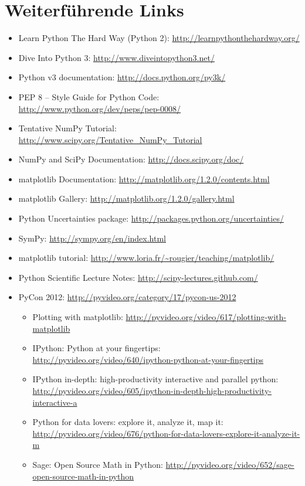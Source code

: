 \section{Weiterführende Links}
\begin{itemize}
  \item Learn Python The Hard Way (Python 2): \url{http://learnpythonthehardway.org/}
  \item Dive Into Python 3: \url{http://www.diveintopython3.net/}
  \item Python v3 documentation: \url{http://docs.python.org/py3k/}
  \item PEP 8 -- Style Guide for Python Code: \url{http://www.python.org/dev/peps/pep-0008/}
  \item Tentative NumPy Tutorial: \url{http://www.scipy.org/Tentative\_NumPy\_Tutorial}
  \item NumPy and SciPy Documentation: \url{http://docs.scipy.org/doc/}
  \item matplotlib Documentation: \url{http://matplotlib.org/1.2.0/contents.html}
  \item matplotlib Gallery: \url{http://matplotlib.org/1.2.0/gallery.html}
  \item Python Uncertainties package: \url{http://packages.python.org/uncertainties/}
  \item SymPy: \url{http://sympy.org/en/index.html}
  \item matplotlib tutorial: \url{http://www.loria.fr/~rougier/teaching/matplotlib/}
  \item Python Scientific Lecture Notes: \url{http://scipy-lectures.github.com/}
  \item PyCon 2012: \url{http://pyvideo.org/category/17/pycon-us-2012}
    \begin{itemize}
      \item Plotting with matplotlib: \url{http://pyvideo.org/video/617/plotting-with-matplotlib}
      \item IPython: Python at your fingertips: \url{http://pyvideo.org/video/640/ipython-python-at-your-fingertips}
      \item IPython in-depth: high-productivity interactive and parallel python: \url{http://pyvideo.org/video/605/ipython-in-depth-high-productivity-interactive-a}
      \item Python for data lovers: explore it, analyze it, map it: \url{http://pyvideo.org/video/676/python-for-data-lovers-explore-it-analyze-it-m}
      \item Sage: Open Source Math in Python: \url{http://pyvideo.org/video/652/sage-open-source-math-in-python}

\end{itemize}
\end{itemize}
